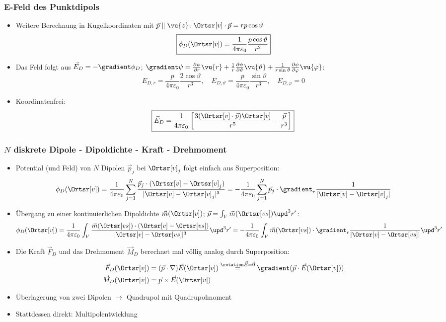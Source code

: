   \begin{frame}
    \frametitle{E-Feld des Punktdipols}
    \begin{itemize}[<+->]
    \item Weitere Berechnung in Kugelkoordinaten mit $\vec{p}\parallel\vu{z}$: $\Ortsr[v]\cdot\vec{p} = r p \cos\vartheta$
      $$
    \boxed{\phi_D(\Ortsr[v]) = \frac{1}{4\pi\varepsilon_0} \frac{p\cos\vartheta}{r^2} }
    $$
  \item Das Feld folgt aus $\vec{E}_D = -\gradient \phi_D $; $\gradient\psi = \frac{\partial\psi}{\partial r}\vu{r} + \frac{1}{r} \frac{\partial\psi}{\partial \vartheta}\vu{\vartheta} + \frac{1}{r\sin\vartheta} \frac{\partial\psi}{\partial \varphi}\vu{\varphi}$:
    $$
    \boxed{E_{D,r} = \frac{p}{4\pi\varepsilon_0} \frac{2\cos\vartheta}{r^3}, \quad E_{D,\vartheta} = \frac{p}{4\pi\varepsilon_0} \frac{\sin\vartheta}{r^3}, \quad E_{D,\varphi} = 0 }
    $$
  \item Koordinatenfrei:
    $$
    \boxed{\vec{E}_{D} = \frac{1}{4\pi\varepsilon_0}\left[ \frac{3(\Ortsr[v]\cdot\vec{p}) \Ortsr[v]}{r^5} -\frac{\vec{p}}{r^3} \right]}    
    $$
      \end{itemize}
    \end{frame}

    \begin{frame}
      \frametitle{$N$ diskrete Dipole - Dipoldichte - Kraft - Drehmoment}
      \begin{itemize}[<+->]
        \item Potential (und Feld) von $N$ Dipolen $\vec{p}_j$ bei $\Ortsr[v]_j$ folgt einfach aus Superposition:
        $$
        \phi_D(\Ortsr[v]) = \frac{1}{4\pi\varepsilon_0} \sum_{j=1}^N \frac{\vec{p}_j\cdot ( \Ortsr[v]-\Ortsr[v]_j)}{|\Ortsr[v]-\Ortsr[v]_j|^3} = -\frac{1}{4\pi\varepsilon_0} \sum_{j=1}^N \vec{p}_j\cdot \gradient_r \frac{1}{|\Ortsr[v]-\Ortsr[v]_j|}   
        $$
      \item Übergang zu einer kontinuierlichen \alert{Dipoldichte} $\vec{m}(\Ortsr[v])$; $\vec{p} = \int_V \vec{m}(\Ortsr[vs])\upd^3 r'$:
        $$
        \phi_D(\Ortsr[v]) = \frac{1}{4\pi\varepsilon_0} \int_V \frac{\vec{m}(\Ortsr[vs])\cdot ( \Ortsr[v]-\Ortsr[vs])}{|\Ortsr[v]-\Ortsr[vs]|^3} \upd^3 r'= -\frac{1}{4\pi\varepsilon_0} \int_V \vec{m}(\Ortsr[vs])\cdot \gradient_r \frac{1}{|\Ortsr[v]-\Ortsr[vs]|}  \upd^3 r'  
        $$
      \item Die \alert{Kraft} $\vec{F}_D$ und das \alert{Drehmoment} $\vec{M}_D$ berechnet mal völlig analog durch Superposition:
        \begin{align*}
          \vec{F}_D(\Ortsr[v]) &= (\vec{p}\cdot\nabla) \vec{E}(\Ortsr[v]) \stackrel{\rotation\vec{E}=\vec{0}}{=} \gradient(\vec{p}\cdot \vec{E}(\Ortsr[v]))\\
          \vec{M}_D(\Ortsr[v]) &= \vec{p} \times \vec{E}(\Ortsr[v])
        \end{align*}
      \item Überlagerung von zwei Dipolen $\to$ \alert{Quadrupol} mit \alert{Quadrupolmoment}
        \item Stattdessen direkt: \alert{Multipolentwicklung}
        \end{itemize}
      \end{frame}

